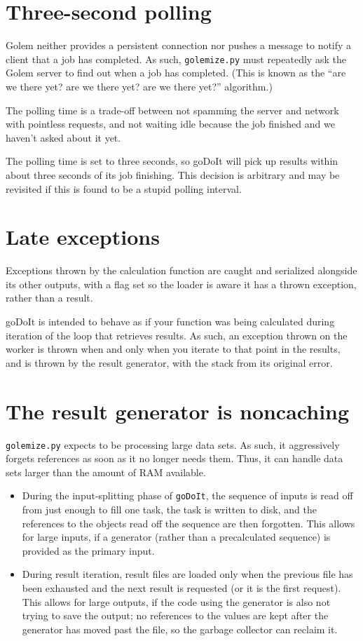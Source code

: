 \documentclass[11pt,ebook,oneside,final]{memoir} %
\begin{document}
\section{Three-second polling}
Golem neither provides a persistent connection nor pushes a message to notify a client that a job has completed. As such, \texttt{golemize.py} must repeatedly ask the Golem server to find out when a job has completed. (This is known as the ``are we there yet? are we there yet? are we there yet?'' algorithm.)

The polling time is a trade-off between not spamming the server and network with pointless requests, and not waiting idle because the job finished and we haven't asked about it yet.

The polling time is set to three seconds, so goDoIt will pick up results within about three seconds of its job finishing. This decision is arbitrary and may be revisited if this is found to be a stupid polling interval.

\section{Late exceptions}
Exceptions thrown by the calculation function are caught and serialized alongside its other outputs, with a flag set so the loader is aware it has a thrown exception, rather than a result.

goDoIt is intended to behave as if your function was being calculated during iteration of the loop that retrieves results. As such, an exception thrown on the worker is thrown when and only when you iterate to that point in the results, and is thrown by the result generator, with the stack from its original error.

\section{The result generator is noncaching}
\texttt{golemize.py} expects to be processing large data sets. As such, it aggressively forgets references as soon as it no longer needs them. Thus, it can handle data sets larger than the amount of RAM available.

\begin{itemize}
	\item During the input-splitting phase of \texttt{goDoIt}, the sequence of inputs is read off from just enough to fill one task, the task is written to disk, and the references to the objects read off the sequence are then forgotten. This allows for large inputs, if a generator (rather than a precalculated sequence) is provided as the primary input.
	\item During result iteration, result files are loaded only when the previous file has been exhausted and the next result is requested (or it is the first request). This allows for large outputs, if the code using the generator is also not trying to save the output; no references to the values are kept after the generator has moved past the file, so the garbage collector can reclaim it.
\end{itemize}
\end{document}
